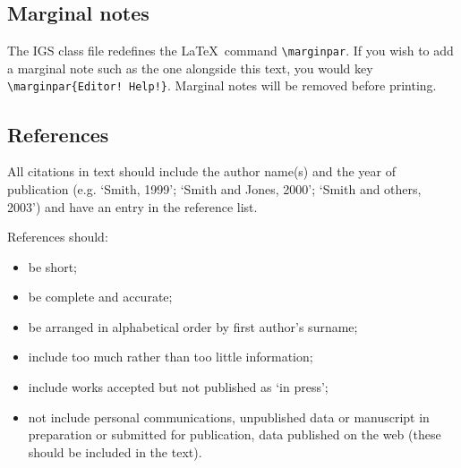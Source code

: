 \documentclass[twocolumn]{igs}
\begin{document}
\subsection{Marginal notes}

The IGS class file redefines the \LaTeX\ command \verb"\marginpar". If you wish to add a marginal note such as the one alongside this text, you would key \verb"\marginpar{Editor! Help!}". Marginal notes will be removed before printing.

\subsection{References}

All citations in text should include the author name(s) and the year of publication (e.g. `Smith, 1999'; `Smith and Jones, 2000'; `Smith and others, 2003') and have an entry in the reference list.

References should:
\begin{itemize}
\item be short;
\item be complete and accurate;
\item be arranged in alphabetical order by first author's surname;
\item include too much rather than too little information;
\item include works accepted but not published as `in press';
\item not include personal communications, unpublished data or manuscript in preparation or submitted for publication, data published on the web (these should be included in the text).
\end{itemize}
\end{document}

